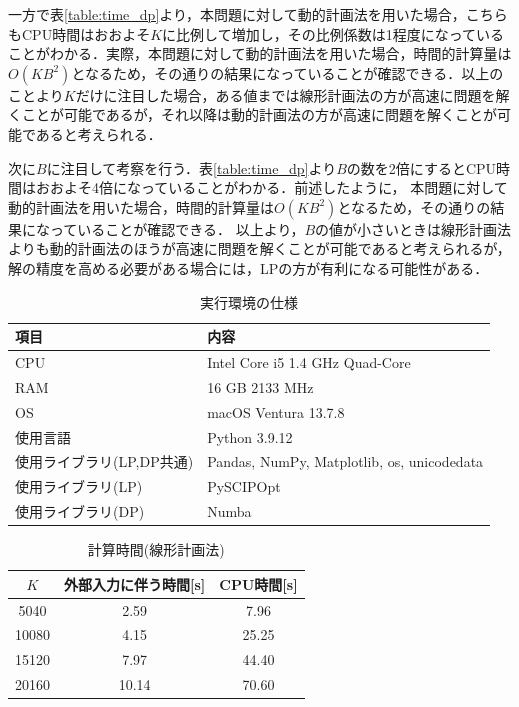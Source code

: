 \documentclass{jarticle}
\begin{document}
一方で表\ref{table:time_dp}より，本問題に対して動的計画法を用いた場合，こちらもCPU時間はおおよそ$K$に比例して増加し，その比例係数は1程度になっていることがわかる．実際，本問題に対して動的計画法を用いた場合，時間的計算量は$O(KB^2)$となるため，その通りの結果になっていることが確認できる．以上のことより$K$だけに注目した場合，ある値までは線形計画法の方が高速に問題を解くことが可能であるが，それ以降は動的計画法の方が高速に問題を解くことが可能であると考えられる．

次に$B$に注目して考察を行う．表\ref{table:time_dp}より$B$の数を2倍にするとCPU時間はおおよそ4倍になっていることがわかる．前述したように，
本問題に対して動的計画法を用いた場合，時間的計算量は$O(KB^2)$となるため，その通りの結果になっていることが確認できる．
以上より，$B$の値が小さいときは線形計画法よりも動的計画法のほうが高速に問題を解くことが可能であると考えられるが，
解の精度を高める必要がある場合には，LPの方が有利になる可能性がある．

\begin{table}[htbp]
  \centering
  \caption{実行環境の仕様}
  \label{table:environment}
  \begin{tabular}{ll}
    \hline
    項目 & 内容 \\
    \hline \hline
    CPU & Intel Core i5 1.4 GHz Quad-Core \\
    RAM & 16 GB 2133 MHz\\
    OS & macOS Ventura 13.7.8 \\
    使用言語 & Python 3.9.12\\
    使用ライブラリ(LP,DP共通) & Pandas, NumPy, Matplotlib, os, unicodedata\\ 
     使用ライブラリ(LP) & PySCIPOpt\\
     使用ライブラリ(DP)& Numba\\
    \hline
  \end{tabular}
\end{table}

\begin{table}[htbp]
  \centering
  \caption{計算時間(線形計画法)}
  \label{table:time_lp}
  \begin{tabular}{ccc}
    \hline
    $K$ & 外部入力に伴う時間[s] & CPU時間[s]\\ 
    \hline \hline
     5040 & 2.59 & 7.96\\
    10080 & 4.15& 25.25\\
    15120 &  7.97&44.40\\
    20160 &  10.14&70.60\\
    \hline
  \end{tabular}
\end{table}
\end{document}

